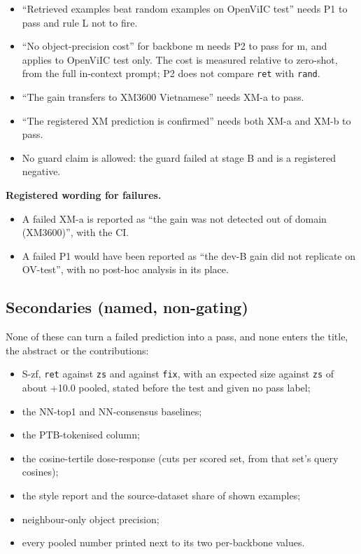 \begin{itemize}
\tightlist
\item
  ``Retrieved examples beat random examples on OpenViIC test'' needs P1 to pass and rule L not to
  fire.
\item
  ``No object-precision cost'' for backbone m needs P2 to pass for m, and applies to OpenViIC test
  only. The cost is measured relative to zero-shot, from the full in-context prompt; P2 does not
  compare \texttt{ret} with \texttt{rand}.
\item
  ``The gain transfers to XM3600 Vietnamese'' needs XM-a to pass.
\item
  ``The registered XM prediction is confirmed'' needs both XM-a and XM-b to pass.
\item
  No guard claim is allowed: the guard failed at stage B and is a registered negative.
\end{itemize}

\textbf{Registered wording for failures.}

\begin{itemize}
\tightlist
\item
  A failed XM-a is reported as ``the gain was not detected out of domain (XM3600)'', with the CI.
\item
  A failed P1 would have been reported as ``the dev-B gain did not replicate on OV-test'', with no
  post-hoc analysis in its place.
\end{itemize}

\subsection{Secondaries (named, non-gating)}\label{secondaries-named-non-gating}

None of these can turn a failed prediction into a pass, and none enters the title, the abstract or
the contributions:

\begin{itemize}
\tightlist
\item
  S-zf, \texttt{ret} against \texttt{zs} and against \texttt{fix}, with an expected size against
  \texttt{zs} of about +10.0 pooled, stated before the test and given no pass label;
\item
  the NN-top1 and NN-consensus baselines;
\item
  the PTB-tokenised column;
\item
  the cosine-tertile dose-response (cuts per scored set, from that set's query cosines);
\item
  the style report and the source-dataset share of shown examples;
\item
  neighbour-only object precision;
\item
  every pooled number printed next to its two per-backbone values.
\end{itemize}

